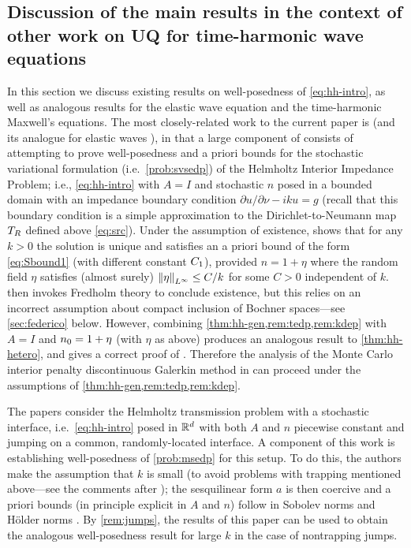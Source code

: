 \subsection{Discussion of the main results in the context of other work on UQ for time-harmonic wave equations}\label{sec:otherwork}

In this section we discuss existing results on well-posedness of \eqref{eq:hh-intro}, as well as analogous results for the elastic wave equation and the time-harmonic Maxwell's equations. The most closely-related work to the current paper is \cite{FeLiLo:15} (and its analogue for elastic waves \cite{FeLo:17}), in that a large component of \cite{FeLiLo:15} consists of attempting to prove well-posedness and a priori bounds for the stochastic variational formulation (i.e.~\cref{prob:svsedp}) of the Helmholtz Interior Impedance Problem; i.e., \eqref{eq:hh-intro} with $A=I$ and stochastic $n$ posed in a bounded domain with an impedance boundary condition $\partial u/\partial \nu - ik u = g$ (recall that this boundary condition is a simple approximation to the Dirichlet-to-Neumann map $T_{R}$ defined above \eqref{eq:src}). Under the assumption of existence, \cite{FeLiLo:15} shows that for any $k>0$ the solution is unique and satisfies an a priori bound of the form \eqref{eq:Sbound1} (with different constant $C_{1}$), provided $n=1+\eta$ where the random field $\eta$ satisfies (almost surely) $\N{\eta}_{L^\infty} \leq C/k$ for some $C>0$ independent of $k$. \cite{FeLiLo:15} then invokes Fredholm theory to conclude existence, but this relies on an incorrect assumption about compact inclusion of Bochner spaces---see \cref{sec:federico} below. However, combining \cref{thm:hh-gen,rem:tedp,rem:kdep} with $A=I$ and $n_{0}=1+\eta$ (with $\eta$ as above) produces an analogous result to \cref{thm:hh-hetero}, and gives a correct proof of \cite[Theorem 2.5]{FeLiLo:15}. Therefore the analysis of the Monte Carlo interior penalty discontinuous Galerkin method in \cite{FeLiLo:15} can proceed under the assumptions of \cref{thm:hh-gen,rem:tedp,rem:kdep}.

The papers \cite{HiScScSc:15,Sc:17} consider the Helmholtz transmission problem with a stochastic interface, i.e.~\eqref{eq:hh-intro} posed in $\mathbb R^{d}$ with both $A$ and $n$ piecewise constant and jumping on a common, randomly-located interface. A component of this work is establishing well-posedness of \cref{prob:msedp} for this setup. To do this, the authors make the assumption that $k$ is small (to avoid problems with trapping mentioned above---see the comments after \cite[Theorem 4.3]{HiScScSc:15}); the sesquilinear form $a$ is then coercive and a priori bounds (in principle explicit in $A$ and $n$) follow in Sobolev norms \cite[Lemma 4.5]{HiScScSc:15} and H\"older norms \cite[Theorem 5.1 and Corollary 5.2]{Sc:17}. By \cref{rem:jumps}, the results of this paper can be used to obtain the analogous well-posedness result for large $k$ in the case of nontrapping jumps.

